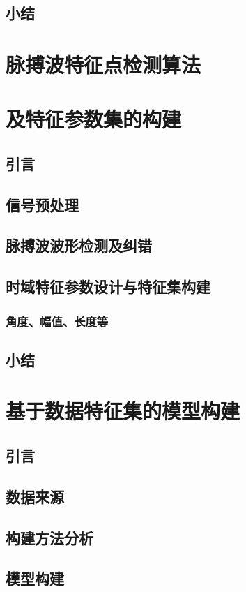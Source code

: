 \section{小结}


\chapter{脉搏波特征点检测算法}

\chapter{及特征参数集的构建}
\section{引言}
\section{信号预处理}
\section{脉搏波波形检测及纠错}
\section{时域特征参数设计与特征集构建}
\subsection{角度、幅值、长度等}
\section{小结}

\chapter{基于数据特征集的模型构建}
\section{引言}

\section{数据来源}
\section{构建方法分析}
\section{模型构建}
